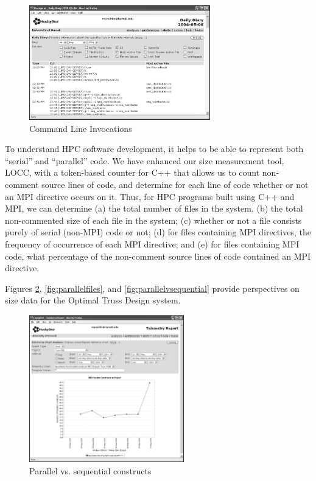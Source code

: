 \documentclass[10pt,twocolumn]{article}
\begin{document}
\begin{figure}[htpb]
  \centering
  \includegraphics[width=0.70\textwidth]{truss.commandlineinvocations.eps}
  \caption{Command Line Invocations}
  \label{fig:commandlineinvocations}
\end{figure}


To understand HPC software development, it helps to be able to represent
both ``serial'' and ``parallel'' code.  We have enhanced our size
measurement tool, LOCC, with a token-based counter for C++ that allows us
to count non-comment source lines of code, and determine for each line of
code whether or not an MPI directive occurs on it.  Thus, for HPC programs
built using C++ and MPI, we can determine (a) the total number of files in
the system, (b) the total non-commented size of each file in the system;
(c) whether or not a file consists purely of serial (non-MPI) code or not;
(d) for files containing MPI directives, the frequency of occurrence of
each MPI directive; and (e) for files containing MPI code, what percentage
of the non-comment source lines of code contained an MPI directive.

Figures \ref{fig:parallelconstructs}, \ref{fig:parallelfiles},
and \ref{fig:parallelvsequential} provide perspectives on
size data for the Optimal Truss Design system.

\begin{figure}[htpb]
  \centering
  \includegraphics[width=0.60\textwidth]{truss.parallelconstructs.eps}
  \caption{Parallel vs. sequential constructs}
  \label{fig:parallelconstructs}
\end{figure}
\end{document}
